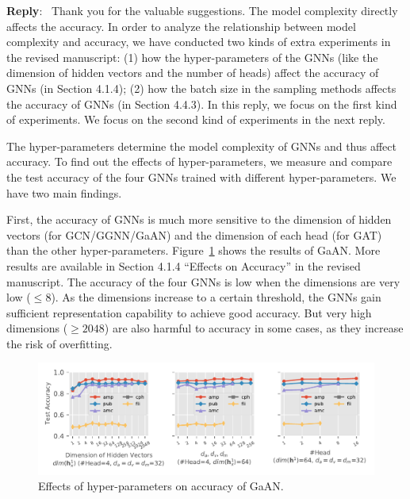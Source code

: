 \documentclass[12pt]{article}
\newenvironment{reply}
   {\medskip \noindent \textbf{Reply}:\  }
   {\medskip}
\begin{document}
\begin{reply}
    Thank you for the valuable suggestions.
    The model complexity directly affects the accuracy.
    In order to analyze the relationship between model complexity and accuracy, we have conducted two kinds of extra experiments in the revised manuscript: (1) how the hyper-parameters of the GNNs (like the dimension of hidden vectors and the number of heads) affect the accuracy of GNNs (in Section 4.1.4); (2) how the batch size in the sampling methods affects the accuracy of GNNs (in Section 4.4.3).
    In this reply, we focus on the first kind of experiments.
    We focus on the second kind of experiments in the next reply.
    
    The hyper-parameters determine the model complexity of GNNs and thus affect accuracy.
    To find out the effects of hyper-parameters, we measure and compare the test accuracy of the four GNNs trained with different hyper-parameters.
    We have two main findings.
    
    First, the accuracy of GNNs is much more sensitive to the dimension of hidden vectors (for GCN/GGNN/GaAN) and the dimension of each head (for GAT) than the other hyper-parameters.
    Figure~\ref{fig:effect_of_hyper_parameter_on_accuracy_of_gaan} shows the results of GaAN.
    More results are available in Section 4.1.4 ``Effects on Accuracy'' in the revised manuscript.
    The accuracy of the four GNNs is low when the dimensions are very low ($\leq 8$).
    As the dimensions increase to a certain threshold, the GNNs gain sufficient representation capability to achieve good accuracy.
    But very high dimensions ($\geq 2048$) are also harmful to accuracy in some cases, as they increase the risk of overfitting.
    
    \begin{figure}[h]
        \includegraphics[width=1.0\columnwidth]{../figs/experiments/exp_hyperparameter_on_accuracy_gaan.pdf}
        \caption{Effects of hyper-parameters on accuracy of GaAN.}
        \label{fig:effect_of_hyper_parameter_on_accuracy_of_gaan}
   

\end{figure}
\end{reply}
\end{document}
